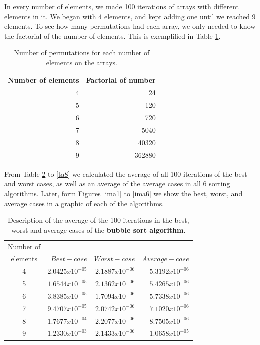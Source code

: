 \documentclass{article}
\begin{document}
In every number of elements, we made 100 iterations of arrays with different elements in it. We began with 4 elements, and kept adding one until we reached 9 elements. To see how many permutations had each array, we only needed to know the factorial of the number of elements. This is exemplified in Table \ref{ta2}.


 \begin{table}[h!]
\centering
 \caption{Number of permutations for each number of elements on the arrays.} 
 \label{ta2}
 \begin{tabular} {| r | r | }
 \hline
Number of elements&	Factorial of number\\
\hline
4 & 24 \\
\hline
5 & 120\\
\hline
6 & 720 \\
\hline
7 & 5040\\
\hline
8 & 40320\\
\hline
9 & 362880\\
\hline
 \end{tabular}
 \end{table}
 
 
 From Table \ref{ta3} to \ref{ta8} we calculated the average of all 100 iterations of the best and worst cases, as well as an average of the average cases in all 6 sorting algorithms. Later, form Figures \ref{ima1} to \ref{ima6} we show the best, worst, and average cases in a graphic of each of the algorithms.\\
 
   \begin{table}[h!]
\centering
 \caption{Description of the average of the 100 iterations in the best, worst and average cases of the \textbf{bubble sort algorithm}. } 
 \label{ta3}
 \begin{tabular} {| c | r | r | r | }
 \hline
Number of 	&		&		&		\\
 elements	&		$	Best-case	$	&	$	Worst-case	$	&	$	Average -case	$	\\
 \hline
4	&	$	2.0425x10^{-05}	$	&	$	2.1887x10^{-06}	$	&	$	5.3192x10^{-06}	$	\\
 \hline
5	&	$	1.6544x10^{-05}	$	&	$	2.1362x10^{-06}	$	&	$	5.4265x10^{-06}	$	\\
 \hline
6	&	$	3.8385x10^{-05}	$	&	$	1.7094x10^{-06}	$	&	$	5.7338x10^{-06}	$	\\
 \hline
7	&	$	9.4707x10^{-05}	$	&	$	2.0742x10^{-06}	$	&	$	7.1020x10^{-06}	$	\\
 \hline
8	&	$	1.7677x10^{-04}	$	&	$	2.2077x10^{-06}	$	&	$	8.7505x10^{-06}	$	\\
 \hline
9	&	$	1.2330x10^{-03}	$	&	$	2.1433x10^{-06}	$	&	$	1.0658x10^{-05}	$	\\
\hline
 \end{tabular}
 \end{table}
 
\end{document}
